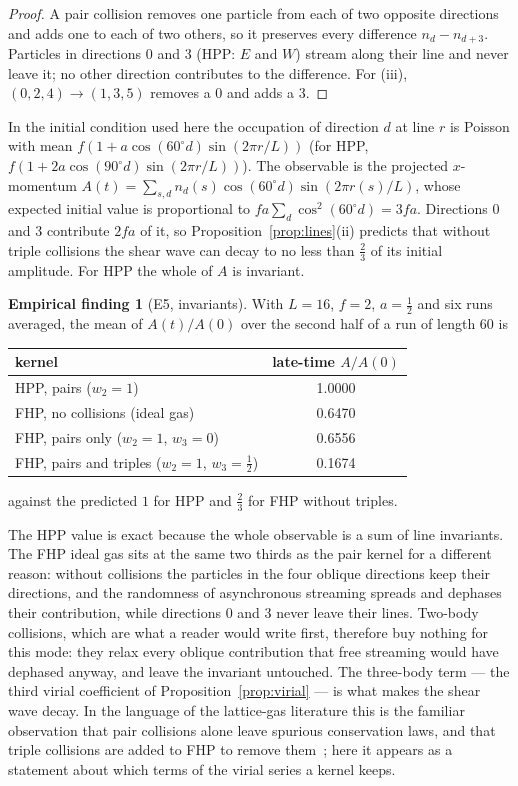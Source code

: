\documentclass[11pt,a4paper]{article}
\theoremstyle{plain}
\theoremstyle{definition}
\newtheorem{finding}[theorem]{Empirical finding}
\theoremstyle{remark}
\begin{document}
\begin{proof}
A pair collision removes one particle from each of two opposite directions and
adds one to each of two others, so it preserves every difference
$n_d-n_{d+3}$. Particles in directions $0$ and $3$ (HPP: $E$ and $W$) stream
along their line and never leave it; no other direction contributes to the
difference. For (iii), $(0,2,4)\to(1,3,5)$ removes a $0$ and adds a $3$.
\end{proof}

In the initial condition used here the occupation of direction $d$ at line $r$
is Poisson with mean $f(1 + a\cos(60^\circ d)\sin(2\pi r/L))$ (for HPP,
$f(1 + 2a\cos(90^\circ d)\sin(2\pi r/L))$). The observable is
the projected $x$-momentum $A(t)=\sum_{s,d} n_d(s)\cos(60^\circ d)
\sin(2\pi r(s)/L)$, whose expected initial value is proportional to
$fa\sum_d\cos^2(60^\circ d) = 3fa$. Directions $0$ and $3$ contribute $2fa$
of it, so Proposition~\ref{prop:lines}(ii) predicts that without triple
collisions the shear wave can decay to no less than $\tfrac23$ of its initial
amplitude. For HPP the whole of $A$ is invariant.

\begin{finding}[E5, invariants]\label{find:plateau}
With $L=16$, $f=2$, $a=\tfrac12$ and six runs averaged, the mean of $A(t)/A(0)$
over the second half of a run of length $60$ is
\begin{center}
\begin{tabular}{lc}
\toprule
kernel & late-time $A/A(0)$\\
\midrule
HPP, pairs ($w_2=1$) & 1.0000\\
FHP, no collisions (ideal gas) & 0.6470\\
FHP, pairs only ($w_2=1$, $w_3=0$) & 0.6556\\
FHP, pairs and triples ($w_2=1$, $w_3=\tfrac12$) & 0.1674\\
\bottomrule
\end{tabular}
\end{center}
against the predicted $1$ for HPP and $\tfrac23$ for FHP without triples.
\end{finding}

The HPP value is exact because the whole observable is a sum of line
invariants. The FHP ideal gas sits at the same two thirds as the pair kernel
for a different reason: without collisions the particles in the four oblique
directions keep their directions, and the randomness of asynchronous streaming
spreads and dephases their contribution, while directions $0$ and $3$ never
leave their lines. Two-body collisions, which are what a reader would write
first, therefore buy nothing for this mode: they relax every oblique
contribution that free streaming would have dephased anyway, and leave the
invariant untouched. The three-body term --- the third virial coefficient of
Proposition~\ref{prop:virial} --- is what makes the shear wave decay. In the
language of the lattice-gas literature this is the familiar observation that
pair collisions alone leave spurious conservation laws, and that triple
collisions are added to FHP to remove them~\cite{FHP87}; here it appears as a
statement about which terms of the virial series a kernel keeps.
\end{document}

